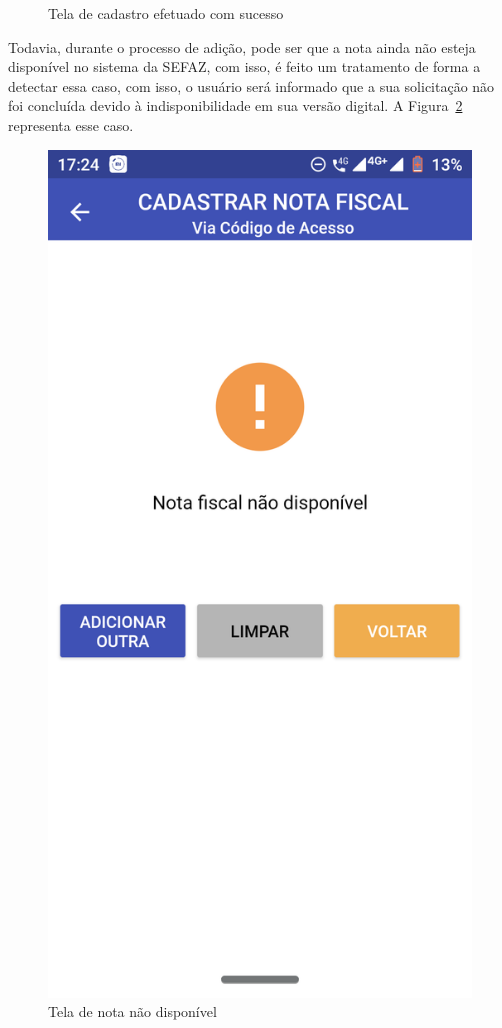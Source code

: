 \begin{figure}[h]
    \caption{Tela de cadastro efetuado com sucesso}
    \label{appQRCodeSucessoFig}
\end{figure}

\newpage
Todavia, durante o processo de adição, pode ser que a nota ainda não esteja disponível no sistema da SEFAZ, com isso, é feito um tratamento de forma a detectar essa caso, com isso, o usuário será informado que a sua solicitação não foi concluída devido à indisponibilidade em sua versão digital. A Figura~\ref{appQRCodeNaoDisponivelFig} representa esse caso.

\begin{figure}[h]
    \centering
    \includegraphics[scale=0.15]{tcc/figures/app/app_codigo_acesso_nao_disponivel.png}
    \caption{Tela de nota não disponível}
    \label{appQRCodeNaoDisponivelFig}
\end{figure}

